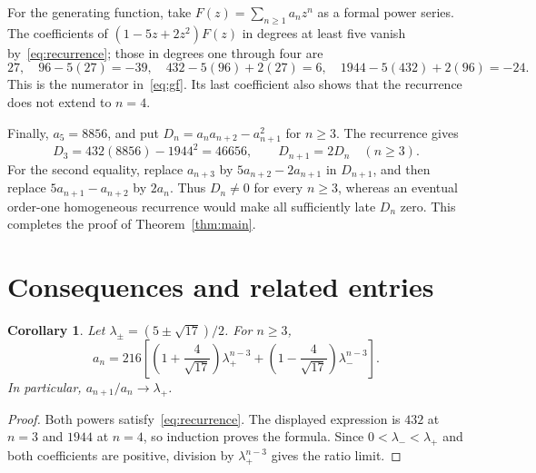 \documentclass[11pt,a4paper]{article}
\newtheorem{corollary}[theorem]{Corollary}
\begin{document}
For the generating function, take \(F(z)=\sum_{n\ge1}a_nz^n\) as a formal
power series. The coefficients of \((1-5z+2z^2)F(z)\) in degrees at least
five vanish by~\eqref{eq:recurrence}; those in degrees one through four are
\[
27,\quad 96-5(27)=-39,\quad
432-5(96)+2(27)=6,\quad
1944-5(432)+2(96)=-24.
\]
This is the numerator in~\eqref{eq:gf}. Its last coefficient also shows
that the recurrence does not extend to \(n=4\).

Finally, \(a_5=8856\), and put
\(D_n=a_na_{n+2}-a_{n+1}^2\) for \(n\ge3\).
The recurrence gives
\[
 D_3=432(8856)-1944^2=46656,\qquad D_{n+1}=2D_n\quad(n\ge3).
\]
For the second equality, replace \(a_{n+3}\) by
\(5a_{n+2}-2a_{n+1}\) in \(D_{n+1}\), and then replace
\(5a_{n+1}-a_{n+2}\) by \(2a_n\).
Thus \(D_n\ne0\) for every \(n\ge3\), whereas an eventual order-one
homogeneous recurrence would make all sufficiently late \(D_n\) zero.
This completes the proof of Theorem~\ref{thm:main}.

\section{Consequences and related entries}
\begin{corollary}\label{cor:closed}
Let \(\lambda_\pm=(5\pm\sqrt{17})/2\). For \(n\ge3\),
\[
 a_n=216\left[\left(1+\frac4{\sqrt{17}}\right)\lambda_+^{n-3}
             +\left(1-\frac4{\sqrt{17}}\right)\lambda_-^{n-3}\right].
\]
In particular, \(a_{n+1}/a_n\to\lambda_+\).
\end{corollary}
\begin{proof}
Both powers satisfy~\eqref{eq:recurrence}. The displayed expression is
\(432\) at \(n=3\) and \(1944\) at \(n=4\), so induction proves the
formula. Since \(0<\lambda_-<\lambda_+\) and both coefficients are
positive, division by \(\lambda_+^{n-3}\) gives the ratio limit.
\end{proof}
\end{document}

